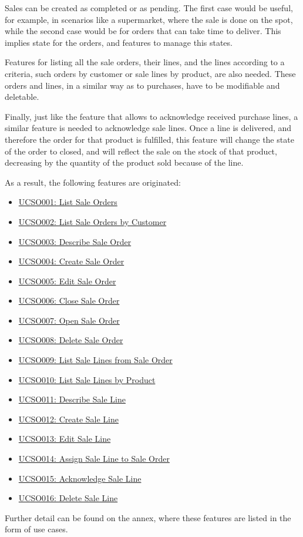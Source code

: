 Sales can be created as completed or as pending. The first case would be useful, for example, in scenarios like a supermarket, where the sale is done on the spot, while the second case would be for orders that can take time to deliver. This implies state for the orders, and features to manage this states.

Features for listing all the sale orders, their lines, and the lines according to a criteria, such orders by customer or sale lines by product, are also needed. These orders and lines, in a similar way as to purchases, have to be modifiable and deletable.

Finally, just like the feature that allows to acknowledge received purchase lines, a similar feature is needed to acknowledge sale lines. Once a line is delivered, and therefore the order for that product is fulfilled, this feature will change the state of the order to closed, and will reflect the sale on the stock of that product, decreasing by the quantity of the product sold because of the line.

As a result, the following features are originated:
\hfill\break
\begin{itemize}
\item \hyperref[UCSO001]{UCSO001: List Sale Orders}
\item \hyperref[UCSO002]{UCSO002: List Sale Orders by Customer}
\item \hyperref[UCSO003]{UCSO003: Describe Sale Order}
\item \hyperref[UCSO004]{UCSO004: Create Sale Order}
\item \hyperref[UCSO005]{UCSO005: Edit Sale Order}
\item \hyperref[UCSO006]{UCSO006: Close Sale Order}
\item \hyperref[UCSO007]{UCSO007: Open Sale Order}
\item \hyperref[UCSO008]{UCSO008: Delete Sale Order}
\item \hyperref[UCSO009]{UCSO009: List Sale Lines from Sale Order}
\item \hyperref[UCSO010]{UCSO010: List Sale Lines by Product}
\item \hyperref[UCSO011]{UCSO011: Describe Sale Line}
\item \hyperref[UCSO012]{UCSO012: Create Sale Line}
\item \hyperref[UCSO013]{UCSO013: Edit Sale Line}
\item \hyperref[UCSO014]{UCSO014: Assign Sale Line to Sale Order}
\item \hyperref[UCSO015]{UCSO015: Acknowledge Sale Line}
\item \hyperref[UCSO016]{UCSO016: Delete Sale Line}
\end{itemize}
\hfill\break
Further detail can be found on the annex, where these features are listed in the form of use cases.